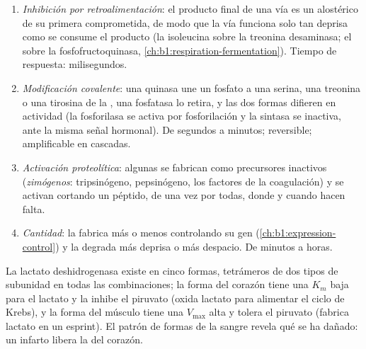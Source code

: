 \begin{proposition}\label{prop:b1:enzymes:control}
\begin{enumerate}
  \item \emph{Inhibición por retroalimentación}: el producto final de una vía es un 
        alostérico de su primera  comprometida, de modo que la vía
        funciona solo tan deprisa como se consume el producto (la
        isoleucina sobre la treonina desaminasa; el  sobre la
        fosfofructoquinasa, \cref{ch:b1:respiration-fermentation}). Tiempo
        de respuesta: milisegundos.
  \item \emph{Modificación covalente}: una
        quinasa une un fosfato a una serina, una treonina o una tirosina de
        la , una fosfatasa lo retira, y las dos formas difieren en
        actividad (la  fosforilasa se activa por fosforilación y
        la  sintasa se inactiva, ante la misma señal hormonal). De
        segundos a minutos; reversible; amplificable en cascadas.
  \item \emph{Activación proteolítica}: algunas  se fabrican como
        precursores inactivos (\emph{zimógenos}: tripsinógeno,
        pepsinógeno, los factores de la coagulación) y se activan cortando
        un péptido, de una vez por todas, donde y cuando hacen falta.
  \item \emph{Cantidad}: la  fabrica más o menos  controlando
        su gen (\cref{ch:b1:expression-control}) y la degrada más deprisa o
        más despacio. De minutos a horas.
\end{enumerate}
\end{proposition}

\begin{example}[Isoenzimas]\label{ex:b1:enzymes:isoenzymes}
La lactato deshidrogenasa existe en cinco formas, tetrámeros de dos tipos de
subunidad en todas las combinaciones; la forma del corazón tiene una $K_m$
baja para el lactato y la inhibe el piruvato (oxida lactato para alimentar
el ciclo de Krebs), y la forma del músculo tiene una $V_{\max}$ alta y
tolera el piruvato (fabrica lactato en un esprint). El patrón de formas de
la sangre revela qué  se ha dañado: un infarto libera la del corazón.
\end{example}

